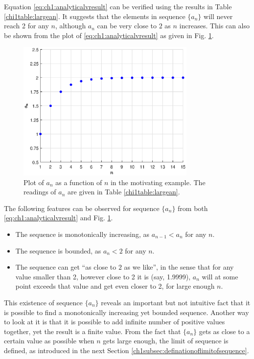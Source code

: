 Equation \eqref{eq:ch1:analyticalvresult} can be verified using the results in Table \ref{chi1table:largean}. It suggests that the elements in sequence $\{a_n\}$ will never reach 2 for any $n$, although $a_n$ can be very close to $2$ as $n$ increases. This can also be shown from the plot of \eqref{eq:ch1:analyticalvresult} as given in Fig. \ref{ch1fig:motivatingexp}.
\begin{figure}
\centering
\includegraphics[width=250pt]{chapters/part-1/figures/fig_motivatingexp.eps}
\caption{Plot of $a_n$ as a function of $n$ in the motivating example. The readings of $a_n$ are given in Table \ref{chi1table:largean}.} \label{ch1fig:motivatingexp}
\end{figure}

The following features can be observed for sequence $\{a_n\}$ from both \eqref{eq:ch1:analyticalvresult} and Fig. \ref{ch1fig:motivatingexp}.
\begin{itemize}
  \item The sequence is monotonically increasing, as $a_{n-1}<a_n$ for any $n$.
  \item The sequence is bounded, as $a_n<2$ for any $n$.
  \item The sequence can get ``as close to $2$ as we like'', in the sense that for any value smaller than 2, however close to 2 it is (say, 1.9999), $a_n$ will at some point exceeds that value and get even closer to 2, for large enough $n$.
\end{itemize}

This existence of sequence $\{a_n\}$ reveals an important but not intuitive fact that it is possible to find a monotonically increasing yet bounded sequence. Another way to look at it is that it is possible to add infinite number of positive values together, yet the result is a finite value. From the fact that $\{a_n\}$ gets as close to a certain value as possible when $n$ gets large enough, the limit of sequence is defined, as introduced in the next Section \ref{ch1subsec:definationoflimitofsequence}.

